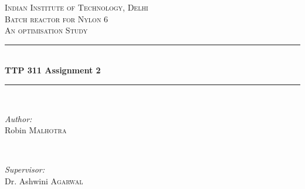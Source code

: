\begin{titlepage}

\newcommand{\HRule}{\rule{\linewidth}{0.5mm}} %

\center %
 

\textsc{\LARGE Indian Institute of Technology, Delhi}\\[1.5cm] %
\textsc{\Large Batch reactor for Nylon 6}\\[0.5cm] %
\textsc{\large An optimisation Study}\\[0.5cm] %


\HRule \\[0.4cm]
{ \huge \bfseries TTP 311 Assignment 2}\\[0.4cm] %
\HRule \\[1.5cm]
 

\begin{minipage}{0.4\textwidth}
\begin{flushleft} \large
\emph{Author:}\\
Robin \textsc{Malhotra} %
\end{flushleft}
\end{minipage}
~
\begin{minipage}{0.4\textwidth}
\begin{flushright} \large
\emph{Supervisor:} \\
Dr. Ashwini \textsc{Agarwal} %
\end{flushright}
\end{minipage}\\[4cm]



\end{titlepage}

